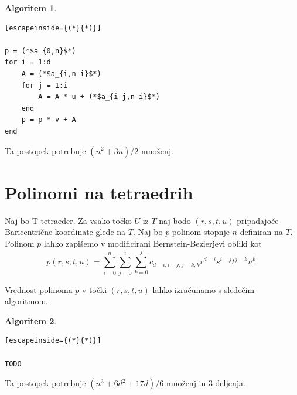 \documentclass{article}
\newtheorem{algoritm}{Algoritem}[section]
\begin{document}
\begin{algoritm}
\begin{lstlisting}[escapeinside={(*}{*)}]

p = (*$a_{0,n}$*)
for i = 1:d
    A = (*$a_{i,n-i}$*)
    for j = 1:i
        A = A * u + (*$a_{i-j,n-i}$*)
    end
    p = p * v + A
end
\end{lstlisting}
\end{algoritm}

Ta postopek potrebuje $(n^2+3n)/2$ množenj.


\section{Polinomi na tetraedrih}

Naj bo T tetraeder. Za vsako točko $U$ iz $T$ naj bodo $(r,s,t,u)$ pripadajoče Baricentrične koordinate glede na $T$.  Naj bo $p$ polinom stopnje $n$ definiran na $T$. Polinom $p$ lahko zapišemo v modificirani Bernstein-Bezierjevi obliki kot 
$$p(r,s,t,u) = \sum_{i = 0}^n{\sum_{j=0}^{i}{\sum_{k = 0}^{j}{c_{d-i,i-j,j-k,k} r^{d-i} s^{i-j} t^{j-k} u^k}}}.$$


Vrednost polinoma $p$ v točki $(r,s,t,u)$ lahko izračunamo s sledečim algoritmom.

\begin{algoritm}
\begin{lstlisting}[escapeinside={(*}{*)}]

TODO

\end{lstlisting}
\end{algoritm}

Ta postopek potrebuje $(n^3+ 6d^2 + 17d)/6$ množenj in 3 deljenja.
\end{document}
